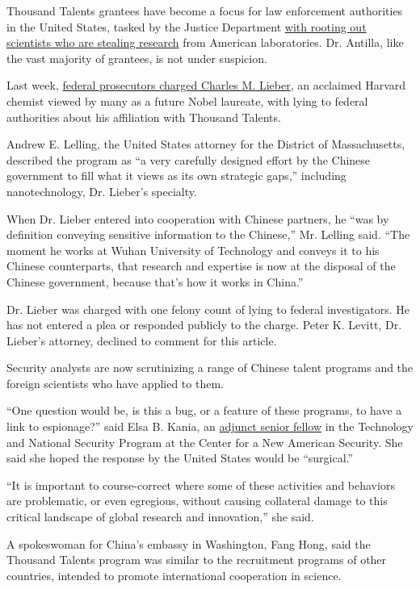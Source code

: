 Thousand Talents grantees have become a focus for law enforcement
authorities in the United States, tasked by the Justice Department
\href{https://www.nytimes3xbfgragh.onion/2019/11/04/health/china-nih-scientists.html}{with
rooting out scientists who are stealing research} from American
laboratories. Dr. Antilla, like the vast majority of grantees, is not
under suspicion.

Last week,
\href{https://www.nytimes3xbfgragh.onion/2020/01/28/us/charles-lieber-harvard.html}{federal
prosecutors charged Charles M. Lieber}, an acclaimed Harvard chemist
viewed by many as a future Nobel laureate, with lying to federal
authorities about his affiliation with Thousand Talents.

Andrew E. Lelling, the United States attorney for the District of
Massachusetts, described the program as ``a very carefully designed
effort by the Chinese government to fill what it views as its own
strategic gaps,'' including nanotechnology, Dr. Lieber's specialty.

When Dr. Lieber entered into cooperation with Chinese partners, he ``was
by definition conveying sensitive information to the Chinese,'' Mr.
Lelling said. ``The moment he works at Wuhan University of Technology
and conveys it to his Chinese counterparts, that research and expertise
is now at the disposal of the Chinese government, because that's how it
works in China.''

Dr. Lieber was charged with one felony count of lying to federal
investigators. He has not entered a plea or responded publicly to the
charge. Peter K. Levitt, Dr. Lieber's attorney, declined to comment for
this article.

Security analysts are now scrutinizing a range of Chinese talent
programs and the foreign scientists who have applied to them.

``One question would be, is this a bug, or a feature of these programs,
to have a link to espionage?'' said Elsa B. Kania, an
\href{https://www.cnas.org/people/elsa-b-kania}{adjunct senior fellow}
in the Technology and National Security Program at the Center for a New
American Security. She said she hoped the response by the United States
would be ``surgical.''

``It is important to course-correct where some of these activities and
behaviors are problematic, or even egregious, without causing collateral
damage to this critical landscape of global research and innovation,''
she said.

A spokeswoman for China's embassy in Washington, Fang Hong, said the
Thousand Talents program was similar to the recruitment programs of
other countries, intended to promote international cooperation in
science.

